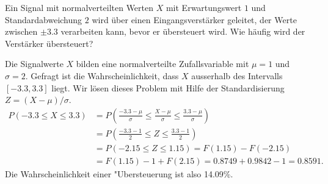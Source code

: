 Ein Signal mit normalverteilten Werten $X$ mit Erwartungswert
$1$ und Standardabweichung $2$ wird über einen Eingangsverstärker
geleitet, der Werte zwischen $\pm3.3$ verarbeiten kann, bevor
er übersteuert wird. Wie häufig wird der Verstärker übersteuert?


\begin{loesung}
Die Signalwerte $X$ bilden eine normalverteilte Zufallsvariable mit $\mu = 1$
und $\sigma=2$. Gefragt ist die Wahrscheinlichkeit, dass
$X$ ausserhalb des Intervalls $[-3.3, 3.3]$ liegt. Wir lösen dieses
Problem mit Hilfe der Standardisierung $Z=(X-\mu)/\sigma$.
\begin{align*}
P(-3.3\le X\le 3.3)
&=
P\left(
\frac{-3.3-\mu }{\sigma}
\le
\frac{X-\mu}{\sigma}
\le
\frac{3.3-\mu }{\sigma}
\right)
\\
&=
P\left(
\frac{-3.3-1}{2}
\le
Z
\le
\frac{3.3-1}{2}
\right)
\\
&=P(-2.15 \le Z \le 1.15)
=F(1.15)-F(-2.15)\\
&=F(1.15)-1+F(2.15)
=0.8749+0.9842 - 1=0.8591.
\end{align*}
Die Wahrscheinlichkeit einer "Ubersteuerung ist also 14.09\%.
\end{loesung}

